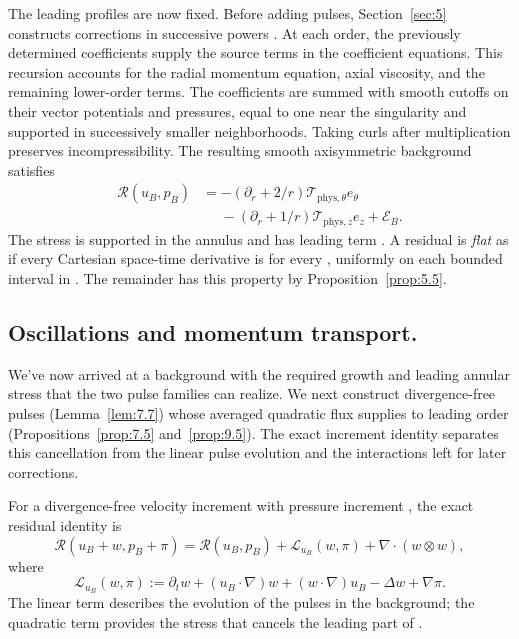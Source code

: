 %
The leading profiles are now fixed. Before adding pulses, Section~\ref{sec:5} constructs corrections
in successive powers . At each order, the previously
determined coefficients supply the source terms in the coefficient equations. This recursion
accounts for the radial momentum equation, axial viscosity, and the remaining lower-order terms.
The coefficients are summed with smooth cutoffs on their vector potentials and pressures, equal to
one near the singularity and supported in successively smaller neighborhoods. Taking curls after
multiplication preserves incompressibility. The resulting smooth axisymmetric background
 satisfies
\[
 \begin{aligned}
 \mathscr R(u_B,p_B)
   & =-(\partial_r+2/r)\mathcal T_{\mathrm{phys},\theta}e_\theta \\
   & \phantom{={}}-(\partial_r+1/r)\mathcal T_{\mathrm{phys},z}e_z+\mathcal E_B.
 \end{aligned}
\]
The stress  is supported in the annulus and has
leading term . A residual is \emph{flat} as
 if every Cartesian space-time derivative is
 for every , uniformly on each bounded
interval in . The remainder  has this
property by Proposition~\ref{prop:5.5}.

\subsection{Oscillations and momentum transport.}\label{sec:3.3}
We've now arrived at a background  with the required growth and
leading annular stress  that the two pulse families can realize. We next
construct divergence-free pulses (Lemma~\ref{lem:7.7}) whose averaged quadratic flux supplies
 to leading order (Propositions~\ref{prop:7.5} and~\ref{prop:9.5}). The exact
increment identity separates this cancellation from the linear pulse evolution and the interactions
left for later corrections.

For a divergence-free velocity increment  with pressure increment
, the exact residual identity is
\[
 \mathscr R(u_B+w,p_B+\pi)=\mathscr R(u_B,p_B)+\mathcal L_{u_B}(w,\pi)
   +\nabla\cdot(w\otimes w),
\]
where
\[
 \mathcal L_{u_B}(w,\pi):=\partial_t w+(u_B\cdot\nabla)w+(w\cdot\nabla)u_B
   -\Delta w+\nabla\pi.
\]
The linear term describes the evolution of the pulses in the background; the quadratic term
provides the stress that cancels the leading part of
.

